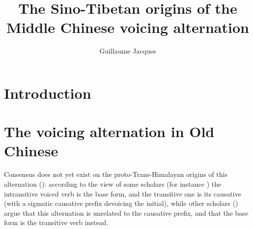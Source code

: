 \documentclass[oneside,a4paper,11pt]{article}
\newcommand{\ipa}[1]{\textbf{{\phon\mbox{#1}}}} %
\newcommand{\zh}[1]{{\cn #1}}
\newcommand{\zhc}[2]{\zh{#1} \ipa{#2}}
\begin{document}
\title{The Sino-Tibetan origins of the Middle Chinese voicing alternation}
\author{Guillaume Jacques}
\maketitle


%
%

 \section*{Introduction}
 \section{The voicing alternation in Old Chinese}
Consensus does not yet exist on the proto-Trans-Himalayan origins of this alternation (\citealt{handel12valence}): according to the view of some scholars (for instance \citealt{mei12caus}) the intransitive voiced verb is the base form, and the transitive one is its causative (with a sigmatic causative prefix devoicing the initial), while other scholars (\citealt{sagart12sprefix}) argue that this alternation is unrelated to the causative prefix, and that the base form is the transitive verb instead.
 
\end{document}
